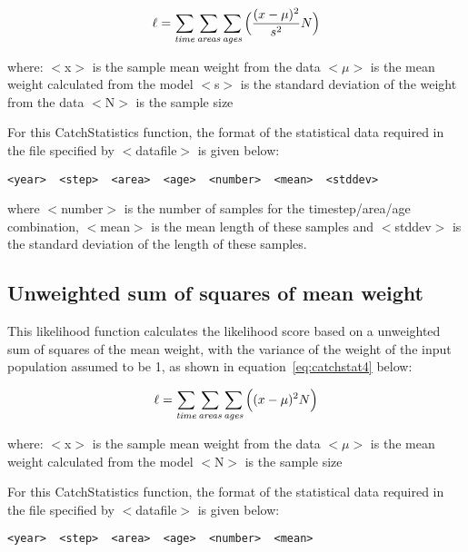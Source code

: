 \documentclass [a4paper, 10pt]{book}
\begin{document}
\begin{equation}\label{eq:catchstat3}
\ell = \sum_{\it time}\sum_{\it areas}\sum_{\it ages} \Big(\frac{(x-\mu)^2} {s^2} N\Big)
\end{equation}

where:\newline
$<$x$>$ is the sample mean weight from the data\newline
$<$$\mu$$>$ is the mean weight calculated from the model\newline
$<$s$>$ is the standard deviation of the weight from the data\newline
$<$N$>$ is the sample size

\bigskip
For this CatchStatistics function, the format of the statistical data required in the file specified by $<$datafile$>$ is given below:

\begin{verbatim}
<year>  <step>  <area>  <age>  <number>  <mean>  <stddev>
\end{verbatim}

where $<$number$>$ is the number of samples for the timestep/area/age combination, $<$mean$>$ is the mean length of these samples and $<$stddev$>$ is the standard deviation of the length of these samples.

\subsection{Unweighted sum of squares of mean weight}
This likelihood function calculates the likelihood score based on a unweighted sum of squares of the mean weight, with the variance of the weight of the input population assumed to be 1, as shown in equation~\ref{eq:catchstat4} below:

\begin{equation}\label{eq:catchstat4}
\ell = \sum_{\it time}\sum_{\it areas}\sum_{\it ages} \Big((x-\mu)^2 N\Big)
\end{equation}

where:\newline
$<$x$>$ is the sample mean weight from the data\newline
$<$$\mu$$>$ is the mean weight calculated from the model\newline
$<$N$>$ is the sample size

\bigskip
For this CatchStatistics function, the format of the statistical data required in the file specified by $<$datafile$>$ is given below:

\begin{verbatim}
<year>  <step>  <area>  <age>  <number>  <mean>
\end{verbatim}
\end{document}
